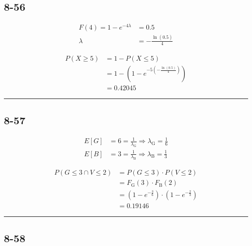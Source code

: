 \documentclass{article}
\newcommand{\qline}{\par\noindent\rule{4.5in}{1pt}}
\begin{document}
		\subsection*{8-56}

			\begin{equation*}
				\begin{split}
					F(4) = 1 - e^{-4\lambda} &= 0.5 \\
					\lambda &= -\frac{\ln(0.5)}{4}
				\end{split}
			\end{equation*}

			\begin{equation*}
				\begin{split}
					P(X \geq 5) &= 1 - P(X \leq 5) \\
					&= 1 - \left( 1 - e^{-5\left( -\frac{\ln(0.5)}{4} \right)} \right) \\
					&= \boxed{\num{0.42045}}
				\end{split}
			\end{equation*}

	\qline

		\subsection*{8-57}

			\begin{equation*}
				\begin{split}
					E[G] &= 6 = \frac{1}{\lambda_\mathrm{G}} \Rightarrow \lambda_\mathrm{G} = \frac{1}{6} \\
					E[B] &= 3 = \frac{1}{\lambda_\mathrm{B}} \Rightarrow \lambda_\mathrm{B} = \frac{1}{3}
				\end{split}
			\end{equation*}

			\begin{equation*}
				\begin{split}
					P(G \leq 3 \cap V \leq 2) &= P(G \leq 3) \cdot P(V \leq 2) \\
					&= F_\mathrm{G}(3) \cdot F_\mathrm{B}(2) \\
					&= \left( 1 - e^{-\frac{3}{6}} \right) \cdot \left( 1 - e^{-\frac{2}{3}} \right) \\
					&= \boxed{\num{0.19146}}
				\end{split}
			\end{equation*}

	\qline

		\subsection*{8-58}
\end{document}
